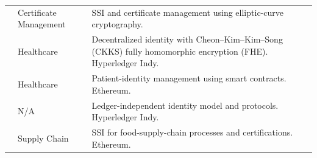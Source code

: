 \begin{longtable}{@{}>{\raggedright\arraybackslash}m{}>{\raggedright\arraybackslash}m{}>{\raggedright\arraybackslash}m{}@{}}
\addlinespace[5pt]
\cite{2021-an-innovative-did} & Certificate Management & SSI and certificate management using elliptic-curve cryptography. \\
\addlinespace[5pt]
\cite{2021-did-prevent-secondary} & Healthcare & Decentralized identity with Cheon--Kim--Kim--Song (CKKS) fully homomorphic encryption (FHE). Hyperledger Indy. \\
\addlinespace[5pt]
\cite{2021-health-ID-decentralized-id} & Healthcare & Patient-identity management using smart contracts. Ethereum. \\
\addlinespace[5pt]
\cite{2021-dec-cross-net-idm} & N/A & Ledger-independent identity model and protocols. Hyperledger Indy. \\
\addlinespace[5pt]
\cite{2021-SSI-food-supply-chain} & Supply Chain & SSI for food-supply-chain processes and certifications. Ethereum. \\
\end{longtable}

